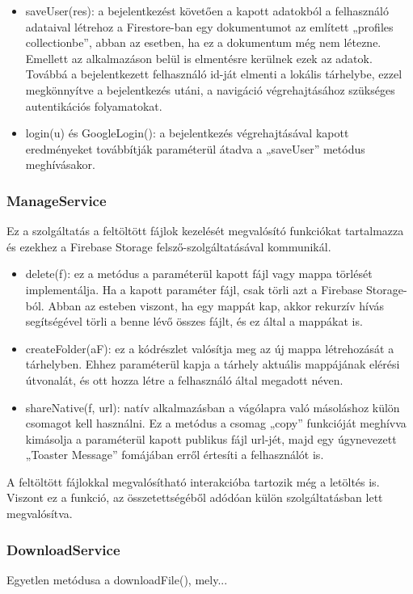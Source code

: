 \documentclass[12pt, twoside]{report}
\begin{document}
\begin{itemize}
	\item saveUser(res): a bejelentkezést követően a kapott adatokból a felhasználó adataival létrehoz a Firestore-ban egy dokumentumot az említett „profiles collectionbe”, abban az esetben, ha ez a dokumentum még nem létezne. Emellett az alkalmazáson belül is elmentésre kerülnek ezek az adatok. Továbbá a bejelentkezett felhasználó id-ját elmenti a lokális tárhelybe, ezzel megkönnyítve a bejelentkezés utáni, a navigáció végrehajtásához szükséges autentikációs folyamatokat.
	\item login(u) és GoogleLogin(): a bejelentkezés végrehajtásával kapott eredményeket továbbítják paraméterül átadva a „saveUser” metódus meghívásakor.
\end{itemize}

\subsubsection{ManageService}
Ez a szolgáltatás a feltöltött fájlok kezelését megvalósító funkciókat tartalmazza és ezekhez a Firebase Storage felsző-szolgáltatásával kommunikál.

\begin{itemize}
	\item delete(f): ez a metódus a paraméterül kapott fájl vagy mappa törlését implementálja. Ha a kapott paraméter fájl, csak törli azt a Firebase Storage-ból. Abban az esteben viszont, ha egy mappát kap, akkor rekurzív hívás segítségével törli a benne lévő összes fájlt, és ez által a mappákat is.
	\item createFolder(aF): ez a kódrészlet valósítja meg az új mappa létrehozását a tárhelyben. Ehhez paraméterül kapja a tárhely aktuális mappájának elérési útvonalát, és ott hozza létre a felhasználó által megadott néven.
	\item shareNative(f, url): natív alkalmazásban a vágólapra való másoláshoz külön csomagot kell használni. Ez a metódus a csomag „copy” funkcióját meghívva kimásolja a paraméterül kapott publikus fájl url-jét, majd egy úgynevezett „Toaster Message” fomájában erről értesíti a felhasználót is.
\end{itemize}

A feltöltött fájlokkal megvalósítható interakcióba tartozik még a letöltés is. Viszont ez a funkció, az összetettségéből adódóan külön szolgáltatásban lett megvalósítva.

\subsubsection{DownloadService}
Egyetlen metódusa a downloadFile(), mely... \\
\\
\\
\\
\end{document}
